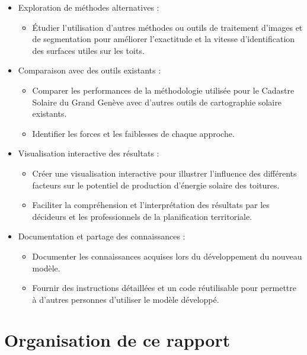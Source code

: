 \begin{itemize}
    \item Exploration de méthodes alternatives :
    \begin{itemize}
        \item Étudier l'utilisation d'autres méthodes ou outils de traitement d'images et de segmentation pour améliorer l'exactitude et la vitesse d'identification des surfaces utiles sur les toits.
    \end{itemize}

    \item Comparaison avec des outils existants :
    \begin{itemize}
        \item Comparer les performances de la méthodologie utilisée pour le Cadastre Solaire du Grand Genève avec d'autres outils de cartographie solaire existants.
        \item Identifier les forces et les faiblesses de chaque approche.
    \end{itemize}

    \item Visualisation interactive des résultats :
    \begin{itemize}
        \item Créer une visualisation interactive pour illustrer l'influence des différents facteurs sur le potentiel de production d'énergie solaire des toitures.
        \item Faciliter la compréhension et l'interprétation des résultats par les décideurs et les professionnels de la planification territoriale.
    \end{itemize}

    \item Documentation et partage des connaissances :
    \begin{itemize}
        \item Documenter les connaissances acquises lors du développement du nouveau modèle.
        \item Fournir des instructions détaillées et un code réutilisable pour permettre à d'autres personnes d'utiliser le modèle développé.
    \end{itemize}
\end{itemize}

\section{Organisation de ce rapport}
